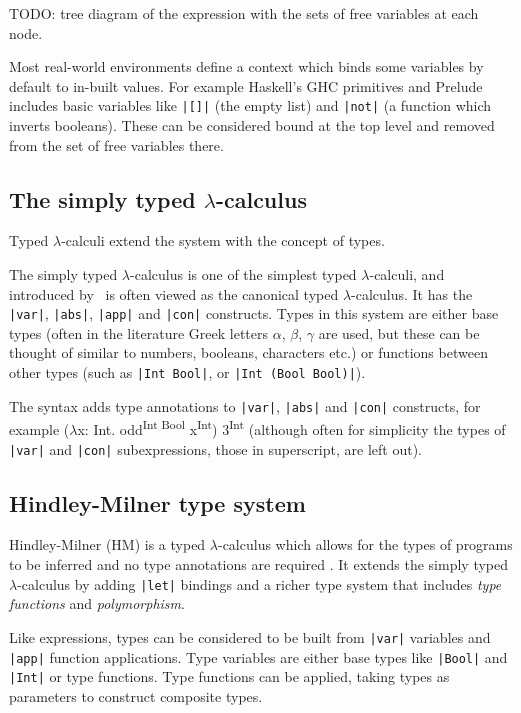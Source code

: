 \documentclass[a4paper,fleqn,12pt]{article}
\begin{document}
TODO: tree diagram of the expression with the sets of free variables at each node.

Most real-world environments define a context which binds some variables by default to in-built values. For example Haskell’s GHC primitives and Prelude includes basic variables like \texttt{|[]|} (the empty list) and \texttt{|not|} (a function which inverts booleans). These can be considered bound at the top level and removed from the set of free variables there.
\subsection{The simply typed $\lambda$-calculus}\label{id:h.w7vj0r89b86n}
Typed $\lambda$-calculi extend the system with the concept of types.

The simply typed $\lambda$-calculus is one of the simplest typed $\lambda$-calculi, and introduced by~\cite{ref11} is often viewed as the canonical typed $\lambda$-calculus. It has the \texttt{|var|}, \texttt{|abs|}, \texttt{|app|} and \texttt{|con|} constructs. Types in this system are either base types (often in the literature Greek letters $\alpha$, $\beta$, $\gamma$ are used, but these can be thought of similar to numbers, booleans, characters etc.) or functions between other types (such as \texttt{|Int \rightarrow Bool|}, or \texttt{|Int \rightarrow (Bool \rightarrow Bool)|}).

The syntax adds type annotations to \texttt{|var|}, \texttt{|abs|} and \texttt{|con|} constructs, for example ($\lambda$x: Int. odd\textsuperscript{Int \rightarrow Bool} x\textsuperscript{Int}) 3\textsuperscript{Int} (although often for simplicity the types of \texttt{|var|} and \texttt{|con|} subexpressions, those in superscript, are left out).
\subsection{Hindley-Milner type system}\label{id:h.gsouq2axz3k}
Hindley-Milner (HM) is a typed $\lambda$-calculus which allows for the types of programs to be inferred and no type annotations are required \citep{ref12,ref13}. It extends the simply typed $\lambda$-calculus by adding \texttt{|let|} bindings and a richer type system that includes \textit{type functions} and \textit{polymorphism}.

Like expressions, types can be considered to be built from \texttt{|var|} variables and \texttt{|app|} function applications. Type variables are either base types like \texttt{|Bool|} and \texttt{|Int|} or type functions. Type functions can be applied, taking types as parameters to construct composite types.
\end{document}
